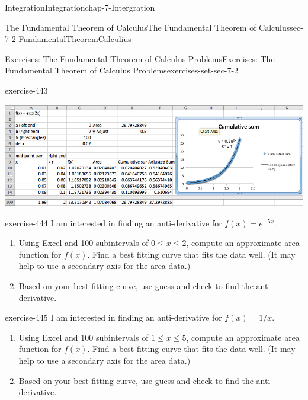 \documentclass[oneside,10pt,]{book}
\numberwithin{equation}{section}
\begin{document}
\begin{chapterptx}{Integration}{}{Integration}{}{}{chap-7-Intergration}
\begin{sectionptx}{The Fundamental Theorem of Calculus}{}{The Fundamental Theorem of Calculus}{}{}{sec-7-2-FundamentalTheoremCalculius}
\begin{exercises-subsection-numberless}{Exercises: The Fundamental Theorem of Calculus Problems}{}{Exercises: The Fundamental Theorem of Calculus Problems}{}{}{exercises-set-sec-7-2}
\begin{divisionexercise}{9}{}{}{exercise-443}
\begin{enumerate}[label=(\alph*)]
\begin{sidebyside}{1}{0}{0}{0}%
\begin{sbspanel}{1}%
\includegraphics[width=1\linewidth]{images/sec7-2-sol9b.png}
\end{sbspanel}%
\end{sidebyside}%
\end{enumerate}
\end{divisionexercise}%
\begin{divisionexercise}{10}{}{}{exercise-444}%
\hypertarget{p-2709}{}%
I am interested in finding an anti-derivative for \(f(x)=e^{-5x}\).%
\leavevmode%
\begin{enumerate}[label=(\alph*)]
\item\hypertarget{li-748}{}\hypertarget{p-2710}{}%
Using Excel and 100 subintervals of \(0 \le  x \le  2\), compute an approximate area function for \(f(x)\).  Find a best fitting curve that fits the data well.  (It may help to use a secondary axis for the area data.)%
\item\hypertarget{li-749}{}\hypertarget{p-2711}{}%
Based on your best fitting curve, use guess and check to find the anti-derivative.%
\end{enumerate}
\end{divisionexercise}%
\begin{divisionexercise}{11}{}{}{exercise-445}%
\hypertarget{p-2712}{}%
I am interested in finding an anti-derivative for \(f(x)=1/x\).%
\leavevmode%
\begin{enumerate}[label=(\alph*)]
\item\hypertarget{li-750}{}\hypertarget{p-2713}{}%
Using Excel and 100 subintervals of \(1 \le  x \le  5\), compute an approximate area function for \(f(x)\).  Find a best fitting curve that fits the data well.  (It may help to use a secondary axis for the area data.)%
\item\hypertarget{li-751}{}\hypertarget{p-2714}{}%
Based on your best fitting curve, use guess and check to find the anti-derivative.%
\end{enumerate}
\par\smallskip%

\end{divisionexercise}
\end{exercises-subsection-numberless}
\end{sectionptx}
\end{chapterptx}
\end{document}
